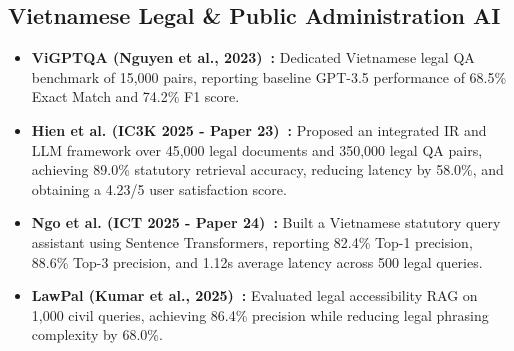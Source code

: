 \documentclass[11pt,a4paper]{article}
\begin{document}
\subsection{Vietnamese Legal & Public Administration AI}
\begin{itemize}
    \item \textbf{ViGPTQA (Nguyen et al., 2023)~\cite{vigptqa2023}:} Dedicated Vietnamese legal QA benchmark of 15,000 pairs, reporting baseline GPT-3.5 performance of 68.5\% Exact Match and 74.2\% F1 score.
    \item \textbf{Hien et al. (IC3K 2025 - Paper 23)~\cite{hien2025integrating}:} Proposed an integrated IR and LLM framework over 45,000 legal documents and 350,000 legal QA pairs, achieving 89.0\% statutory retrieval accuracy, reducing latency by 58.0\%, and obtaining a 4.23/5 user satisfaction score.
    \item \textbf{Ngo et al. (ICT 2025 - Paper 24)~\cite{ngo2025legal}:} Built a Vietnamese statutory query assistant using Sentence Transformers, reporting 82.4\% Top-1 precision, 88.6\% Top-3 precision, and 1.12s average latency across 500 legal queries.
    \item \textbf{LawPal (Kumar et al., 2025)~\cite{lawpal2025}:} Evaluated legal accessibility RAG on 1,000 civil queries, achieving 86.4\% precision while reducing legal phrasing complexity by 68.0\%.
\end{itemize}
\end{document}

